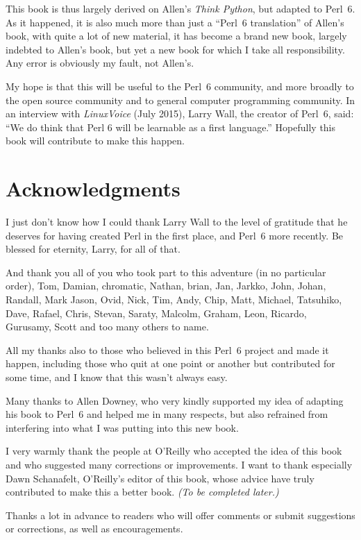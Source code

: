 This book is thus largely derived on Allen's \emph{Think Python}, 
but adapted to Perl~6. As it happened, it is also much more 
than just a ``Perl~6 translation'' of Allen's book, with 
quite a lot of new material, it has become a brand new book, 
largely indebted to Allen's book, but yet a new book for which 
I take all responsibility. Any error is obviously my fault, 
not Allen's.

My hope is that this will be useful to the Perl~6 community, and 
more broadly to the open source community and to general 
computer programming community. In an interview with 
\emph{LinuxVoice} (July 2015), Larry Wall, the creator of Perl~6, 
said: ``We do think that Perl 6 will be learnable as a first language.''
Hopefully this book will contribute to make this happen. 

\section*{Acknowledgments}

I just don't know how I could thank Larry Wall to the level of 
gratitude that he deserves for having created Perl in the first 
place, and Perl~6 more recently. Be blessed for eternity, Larry, 
for all of that. 

And thank you all of you who took part to this 
adventure (in no particular order), Tom, Damian, 
chromatic, Nathan, brian, Jan, Jarkko, John, Johan, Randall, 
Mark Jason, Ovid, Nick, Tim, Andy, Chip, Matt, Michael, Tatsuhiko, 
Dave, Rafael, Chris, Stevan, Saraty, Malcolm, Graham, Leon, 
Ricardo, Gurusamy, Scott and too many others to name.  

All my thanks also to those who believed in 
this Perl~6 project and made it happen, including those who 
quit at one point or another but contributed for some 
time, and I know that this wasn't always easy.

Many thanks to Allen Downey, who very kindly supported my idea of 
adapting his book to Perl~6 and helped me in many respects, but 
also refrained from interfering into what I was putting into 
this new book.

I very warmly thank the people at O'Reilly who accepted the 
idea of this book and who suggested many corrections or 
improvements. I want to thank especially 
Dawn Schanafelt, O'Reilly's editor of this book, whose advice 
have truly contributed to make this a better book. \emph{(To be 
completed later.)}

Thanks a lot in advance to readers who will offer comments 
or submit suggestions or corrections, as well as encouragements.

